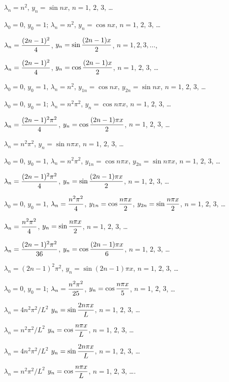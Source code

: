 \medskip

$\lambda_{n}=n^{2}$, $y_{n}=\sin nx$, $n=1$, $2$, $3$, \dots

$\lambda_{0}=0$, $y_{0}=1$;
$\lambda_{n}=n^{2}$, $y_{n}=\cos nx$, $n=1$, $2$, $3$, \dots

$\lambda_{n}=\displaystyle\frac{(2n-1)^{2}}{4}$,
$y_{n}=\displaystyle\sin\frac{(2n-1)x}{2}$,
$n=1,2,3,\dots$,

$\lambda_{n}=\displaystyle\frac{(2n-1)^{2}}{4}$,
$y_{n}=\displaystyle\cos\frac{(2n-1)x}{2}$,
$n=1$, $2$, $3$, \dots

$\lambda_{0}=0$,  $y_{0}=1$,
$\lambda_{n}=n^{2}$, $y_{1n}=\cos nx$, $y_{2n}=\sin nx$,
$n=1$, $2$, $3$, \dots

$\lambda_{0}=0$, $y_{0}=1$; $\lambda_{n}=n^{2}\pi^{2}$, $y_{n}=\cos n\pi x$, $n=1$, $2$, $3$, \dots

$\lambda_{n}=\displaystyle\frac{(2n-1)^{2}\pi^{2}}{4}$,
$y_{n}=\displaystyle\cos\frac{(2n-1)\pi x}{2}$,
$n=1$, $2$, $3$, \dots

$\lambda_{n}=n^{2}\pi^{2}$, $y_{n}=\sin n\pi x$, $n=1$, $2$, $3$, \dots

$\lambda_{0}=0$,  $y_{0}=1$,
$\lambda_{n}=n^{2}\pi^{2}$, $y_{1n}=\cos n\pi x$, $y_{2n}=\sin n\pi x$,
$n=1$, $2$, $3$, \dots

$\lambda_{n}=\displaystyle\frac{(2n-1)^{2}\pi^{2}}{4}$,
$y_{n}=\displaystyle\sin\frac{(2n-1)\pi x}{2}$,
$n=1$, $2$, $3$, \dots

$\lambda_{0}=0$,  $y_{0}=1$,
$\lambda_{n}=\displaystyle\frac{n^{2}\pi^{2}}{4}$, $y_{1n}=\displaystyle\cos\frac{n\pi x}{2}$,
$y_{2n}=\displaystyle\sin\frac{n\pi x}{2}$,
$n=1$, $2$, $3$, \dots

$\lambda_{n}=\displaystyle\frac{n^{2}\pi^{2}}{4}$, $y_{n}=\displaystyle\sin\frac{n\pi x}{2}$,
$n=1$, $2$, $3$, \dots

$\lambda_{n}=\displaystyle\frac{(2n-1)^{2}\pi^{2}}{36}$,
$y_{n}=\displaystyle\cos\frac{(2n-1)\pi x}{6}$,
$n=1$, $2$, $3$, \dots

$\lambda_{n}=(2n-1)^{2}\pi^{2}$,
$y_{n}=\sin(2n-1)\pi x$,
$n=1$, $2$, $3$, \dots

$\lambda_{0}=0$, $y_{0}=1$; $\lambda_{n}=\displaystyle\frac{n^{2}\pi^{2}}{25}$, $y_{n}=\displaystyle\cos\frac{n\pi x}{5}$,
$n=1$, $2$, $3$, \dots

$\lambda_{n}=4n^{2}\pi^{2}/L^{2}$   $y_{n}=\displaystyle\sin\frac{2n\pi x}{L}$,
$n=1$, $2$, $3$, \dots

$\lambda_{n}=n^{2}\pi^{2}/L^{2}$    $y_{n}=\displaystyle\cos\frac{n\pi x}{L}$,
$n=1$, $2$, $3$, \dots

$\lambda_{n}=4n^{2}\pi^{2}/L^{2}$    $y_{n}=\displaystyle\sin\frac{2n\pi x}{L}$,
$n=1$, $2$, $3$, \dots

$\lambda_{n}=n^{2}\pi^{2}/L^{2}$    $y_{n}=\displaystyle\cos\frac{n\pi
x}{L}$, $n=1$, $2$, $3$, \dots.

